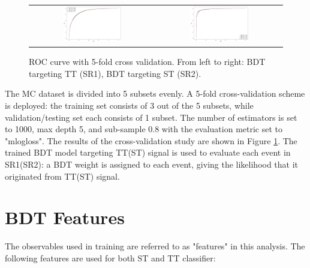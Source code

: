 \begin{figure}[tbh!]
 \begin{center}
 \begin{tabular}{cc}
  \includegraphics[width=0.48\textwidth]{figures/Part3/BDT/5foldTT}&
    \includegraphics[width=0.48\textwidth]{figures/Part3/BDT/5foldST}\\
 \end{tabular}
 \caption{ROC curve with 5-fold cross validation. From left to right: BDT targeting TT (SR1), BDT targeting ST (SR2).}
 \label{fig:5fold}
 \end{center}
\end{figure}

The MC dataset is divided into 5 subsets evenly. A 5-fold cross-validation scheme is deployed: the training set consists of 3 out of the 5 subsets, while validation/testing set each consists of 1 subset. The number of estimators is set to 1000, max depth 5, and sub-sample 0.8 with the evaluation metric set to "mlogloss".  The results of the cross-validation study are shown in Figure \ref{fig:5fold}. The trained BDT model targeting TT(ST) signal is used to evaluate each event in SR1(SR2): a BDT weight is assigned to each event, giving the likelihood that it originated from TT(ST) signal. 

\section{BDT Features}
\label{sec:Input}

The observables used in training are referred to as "features" in this analysis. The following features are used for both ST and TT classifier:

